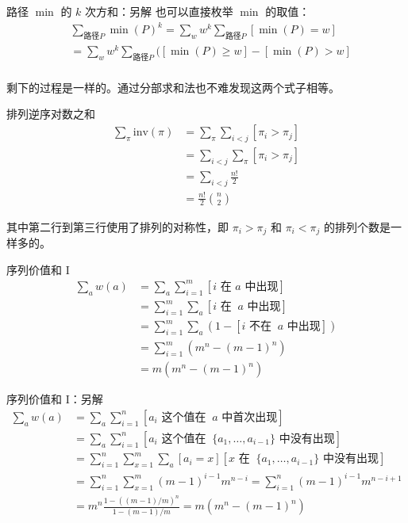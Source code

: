 \begin{frame}{路径 $\min$ 的 $k$ 次方和：另解}
    也可以直接枚举 $\min$ 的取值：
    $$
    \begin{aligned}
        &\sum_{\text{路径}P}\min(P)^k=\sum_w w^k\sum_{\text{路径}P}[\min(P)=w]\\
        &=\sum_{w}w^k\sum_{\text{路径}P}([\min(P)\ge w]-[\min(P)>w]\\
    \end{aligned}
    $$

    剩下的过程是一样的。通过分部求和法也不难发现这两个式子相等。
\end{frame}
\begin{frame}{排列逆序对数之和}
    $$
    \begin{aligned}
    \sum_{\pi}\mathrm{inv}(\pi)&=\sum_{\pi}\sum_{i<j}[\pi_i>\pi_j]\\
    &=\sum_{i<j}\sum_{\pi}[\pi_i>\pi_j]\\
    &=\sum_{i<j}\frac{n!}{2}\\
    &=\frac{n!}{2}\binom{n}{2}
    \end{aligned}
    $$

    其中第二行到第三行使用了排列的对称性，即 $\pi_i>\pi_j$ 和 $\pi_i<\pi_j$ 的排列个数是一样多的。
\end{frame}
\begin{frame}{序列价值和 I}
    $$
    \begin{aligned}
    \sum_{a}w(a)&=\sum_a\sum_{i=1}^m[i\text{ 在 }a\text{ 中出现}]\\
    &=\sum_{i=1}^m\sum_a[i\text{ 在 }\ a\text{ 中出现}]\\
    &=\sum_{i=1}^m\sum_a(1-[i\text{ 不在 }\ a\text{ 中出现}])\\
    &=\sum_{i=1}^m(m^n-(m-1)^n)\\
    &=m(m^n-(m-1)^n)
    \end{aligned}
    $$
\end{frame}
\begin{frame}{序列价值和 I：另解}
    $$
    \begin{aligned}
    \sum_{a}w(a)&=\sum_a\sum_{i=1}^n[a_i\text{ 这个值在 }\ a\text{ 中首次出现}]\\
    &=\sum_a\sum_{i=1}^n[a_i\text{ 这个值在 }\ \{a_1,\ldots,a_{i-1}\}\text{ 中没有出现}]\\
    &=\sum_{i=1}^n\sum_{x=1}^m\sum_{a}[a_i=x][x\text{ 在 }\ \{a_1,\ldots,a_{i-1}\}\text{ 中没有出现}]\\
    &=\sum_{i=1}^n\sum_{x=1}^m(m-1)^{i-1}m^{n-i}=\sum_{i=1}^n(m-1)^{i-1}m^{n-i+1}\\
    &=m^{n}\frac{1-((m-1)/m)^n}{1-(m-1)/m}=m(m^n-(m-1)^n)
    \end{aligned}
    $$
\end{frame}
